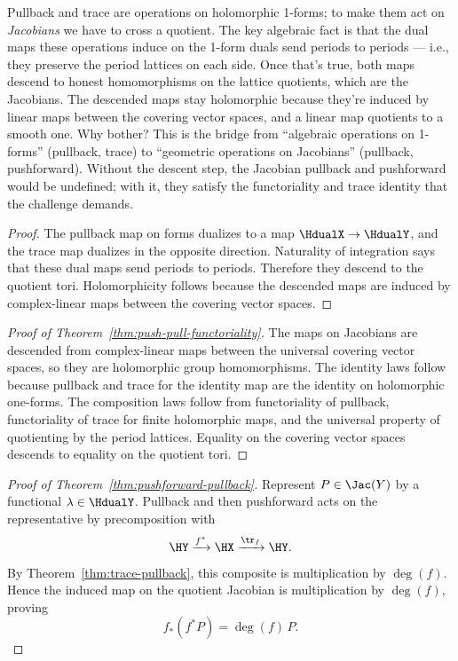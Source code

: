 \begin{layman}
Pullback and trace are operations on holomorphic 1-forms; to make them
act on \emph{Jacobians} we have to cross a quotient. The key algebraic
fact is that the dual maps these operations induce on the 1-form duals
send periods to periods — i.e., they preserve the period lattices on
each side. Once that's true, both maps descend to honest homomorphisms
on the lattice quotients, which are the Jacobians. The descended maps
stay holomorphic because they're induced by linear maps between the
covering vector spaces, and a linear map quotients to a smooth one.
Why bother? This is the bridge from ``algebraic operations on 1-forms''
(pullback, trace) to ``geometric operations on Jacobians'' (pullback,
pushforward). Without the descent step, the Jacobian pullback and
pushforward would be undefined; with it, they satisfy the functoriality
and trace identity that the challenge demands.
\end{layman}

\begin{proof}
The pullback map on forms dualizes to a map \(\HdualX\to\HdualY\), and the
trace map dualizes in the opposite direction. Naturality of integration says
that these dual maps send periods to periods. Therefore they descend to the
quotient tori. Holomorphicity follows because the descended maps are induced
by complex-linear maps between the covering vector spaces.
\end{proof}

\begin{proof}[Proof of Theorem~\ref{thm:push-pull-functoriality}]
The maps on Jacobians are descended from complex-linear maps between the
universal covering vector spaces, so they are holomorphic group homomorphisms.
The identity laws follow because pullback and trace for the identity map are
the identity on holomorphic one-forms. The composition laws follow from
functoriality of pullback, functoriality of trace for finite holomorphic maps,
and the universal property of quotienting by the period lattices. Equality on
the covering vector spaces descends to equality on the quotient tori.
\end{proof}

\begin{proof}[Proof of Theorem~\ref{thm:pushforward-pullback}]
Represent \(P\in\Jac(Y)\) by a functional \(\lambda\in\HdualY\). Pullback and
then pushforward acts on the representative by precomposition with
\[
  \HY \xrightarrow{f^{*}} \HX \xrightarrow{\tr_f} \HY .
\]
By Theorem~\ref{thm:trace-pullback}, this composite is multiplication by
\(\deg(f)\). Hence the induced map on the quotient Jacobian is multiplication
by \(\deg(f)\), proving
\[
  f_*(f^{*}P)=\deg(f)\,P.
\]
\end{proof}
